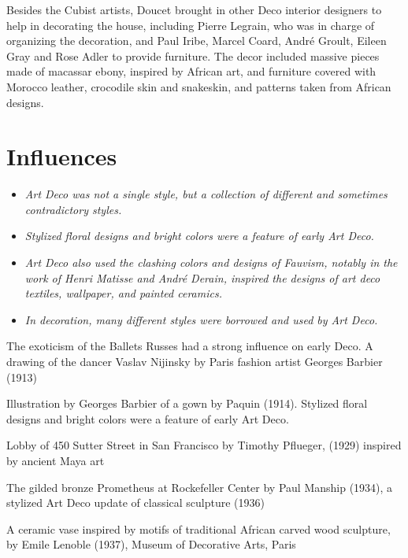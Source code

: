 Besides the Cubist artists, Doucet brought in other Deco interior
designers to help in decorating the house, including Pierre Legrain, who
was in charge of organizing the decoration, and Paul Iribe, Marcel
Coard, André Groult, Eileen Gray and Rose Adler to provide furniture.
The decor included massive pieces made of macassar ebony, inspired by
African art, and furniture covered with Morocco leather, crocodile skin
and snakeskin, and patterns taken from African designs.

\section{Influences}\label{influences}

\begin{itemize}
\item
  \emph{Art Deco was not a single style, but a collection of different
  and sometimes contradictory styles.}
\item
  \emph{Stylized floral designs and bright colors were a feature of
  early Art Deco.}
\item
  \emph{Art Deco also used the clashing colors and designs of Fauvism,
  notably in the work of Henri Matisse and André Derain, inspired the
  designs of art deco textiles, wallpaper, and painted ceramics.}
\item
  \emph{In decoration, many different styles were borrowed and used by
  Art Deco.}
\end{itemize}

The exoticism of the Ballets Russes had a strong influence on early
Deco. A drawing of the dancer Vaslav Nijinsky by Paris fashion artist
Georges Barbier (1913)

Illustration by Georges Barbier of a gown by Paquin (1914). Stylized
floral designs and bright colors were a feature of early Art Deco.

Lobby of 450 Sutter Street in San Francisco by Timothy Pflueger, (1929)
inspired by ancient Maya art

The gilded bronze Prometheus at Rockefeller Center by Paul Manship
(1934), a stylized Art Deco update of classical sculpture (1936)

A ceramic vase inspired by motifs of traditional African carved wood
sculpture, by Emile Lenoble (1937), Museum of Decorative Arts, Paris

